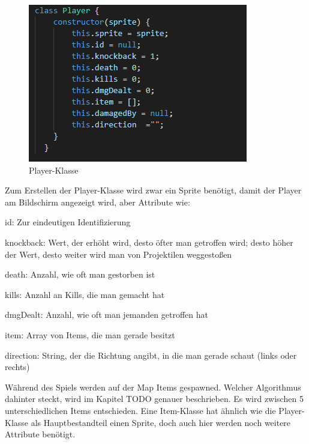 \begin{figure}[H]
    \centering
    \includegraphics[scale=1]{pics/playerClass.PNG}
    \caption{Player-Klasse}
\end{figure}

Zum Erstellen der Player-Klasse wird zwar ein Sprite benötigt, damit der Player am Bildschirm angezeigt wird, aber Attribute wie:
\begin{compactitem}
    \item id: Zur eindeutigen Identifizierung
    \item knockback: Wert, der erhöht wird, desto öfter man getroffen wird; desto höher der Wert, desto weiter wird man von Projektilen weggestoßen
    \item death: Anzahl, wie oft man gestorben ist
    \item kills: Anzahl an Kills, die man gemacht hat
    \item dmgDealt: Anzahl, wie oft man jemanden getroffen hat
    \item item: Array von Items, die man gerade besitzt
    \item direction: String, der die Richtung angibt, in die man gerade schaut (links oder rechts)
\end{compactitem}

Während des Spiels werden auf der Map Items gespawned. Welcher Algorithmus dahinter steckt, wird im Kapitel TODO genauer beschrieben.
Es wird zwischen 5 unterschiedlichen Items entschieden. Eine Item-Klasse hat ähnlich wie die Player-Klasse als Hauptbestandteil einen Sprite, doch auch hier werden noch weitere Attribute benötigt.

